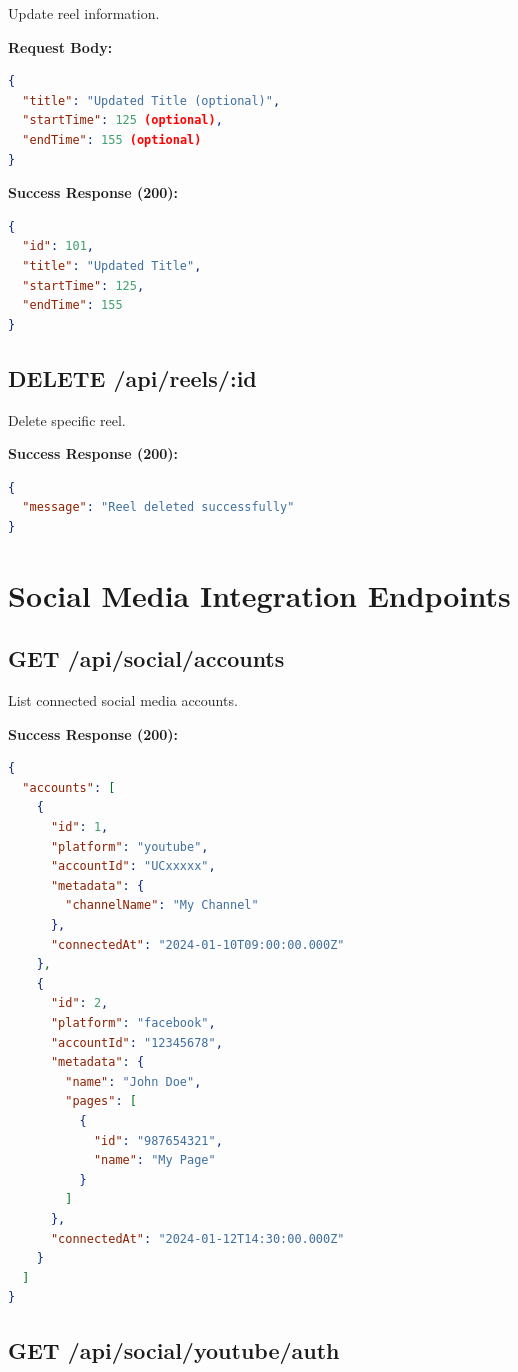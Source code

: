 Update reel information.

\textbf{Request Body:}
\begin{lstlisting}[language=JSON]
{
  "title": "Updated Title (optional)",
  "startTime": 125 (optional),
  "endTime": 155 (optional)
}
\end{lstlisting}

\textbf{Success Response (200):}
\begin{lstlisting}[language=JSON]
{
  "id": 101,
  "title": "Updated Title",
  "startTime": 125,
  "endTime": 155
}
\end{lstlisting}

\subsection{DELETE /api/reels/:id}

Delete specific reel.

\textbf{Success Response (200):}
\begin{lstlisting}[language=JSON]
{
  "message": "Reel deleted successfully"
}
\end{lstlisting}

\section{Social Media Integration Endpoints}

\subsection{GET /api/social/accounts}

List connected social media accounts.

\textbf{Success Response (200):}
\begin{lstlisting}[language=JSON]
{
  "accounts": [
    {
      "id": 1,
      "platform": "youtube",
      "accountId": "UCxxxxx",
      "metadata": {
        "channelName": "My Channel"
      },
      "connectedAt": "2024-01-10T09:00:00.000Z"
    },
    {
      "id": 2,
      "platform": "facebook",
      "accountId": "12345678",
      "metadata": {
        "name": "John Doe",
        "pages": [
          {
            "id": "987654321",
            "name": "My Page"
          }
        ]
      },
      "connectedAt": "2024-01-12T14:30:00.000Z"
    }
  ]
}
\end{lstlisting}

\subsection{GET /api/social/youtube/auth}

